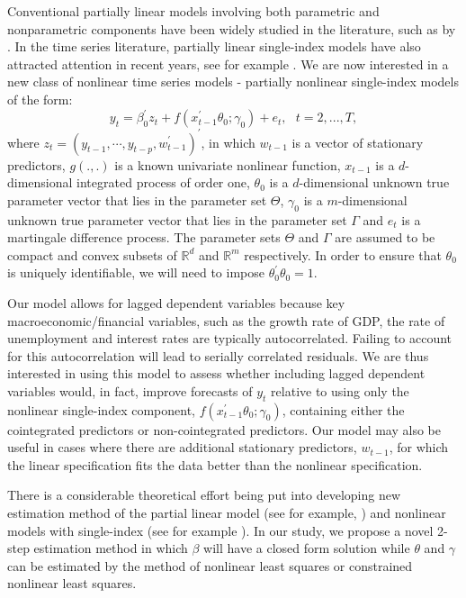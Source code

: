 \documentclass[a4paper,12pt,times,numbered,print,index]{report}
\numberwithin{equation}{section}
\begin{document}
Conventional partially linear models involving both parametric and nonparametric components have been widely studied in the literature, such as by \cite{gao2007nonlinear}. In the time series literature, partially linear single-index models have also attracted attention in recent years, see for example \cite{dong2016estimation}. We are now interested in a new class of nonlinear time series models - partially nonlinear single-index models of the form:
\begin{equation}
y_{t} = \beta_0^{\prime} z_t + f\left( x_{t-1}^{\prime }\theta_0; \gamma_0\right) +e_{t},\ \ \
t=2,...,T,  \label{PL model}
\end{equation}%
where $z_t = (y_{t-1}, \cdots, y_{t-p}, w_{t-1}^{\prime})^{\prime}$, in which $w_{t-1}$ is a vector of stationary predictors, 
$g\left( .,.\right) $ is a known univariate nonlinear function, $x_{t-1}$ is a $d$-dimensional integrated process of order one, $\theta _{0}$ is a $d$-dimensional unknown true parameter vector that lies in the parameter set $\Theta $, $\gamma _{0}$ is a $m$-dimensional unknown true parameter vector that lies in the parameter set $\Gamma $ and $e_{t}$ is a martingale
difference process. The parameter sets $\Theta $ and $\Gamma $ are assumed to be compact and convex subsets of $\mathbb{R}^{d}$ and $\mathbb{R}^{m}$ respectively. In order to ensure that $\theta_0$ is uniquely identifiable, we will need to impose $\theta_{0}^{\prime}\theta_{0} = 1$.

Our model allows for lagged dependent variables because key macroeconomic/financial variables, such as the growth rate of GDP, the rate of unemployment and interest rates are typically autocorrelated. Failing to account for this autocorrelation will lead to serially correlated residuals. We are thus interested in using this model to assess whether including lagged dependent variables would, in fact, improve forecasts of $y_{t}$ relative to using only the nonlinear single-index component, $f\left( x_{t-1}^{\prime }\theta_0; \gamma_0\right)$, containing either the cointegrated predictors or non-cointegrated predictors. Our model may also be useful in cases where there are additional stationary predictors, $w_{t-1}$, for which the linear specification fits the data better than the nonlinear specification.

There is a considerable theoretical effort being put into developing new estimation method of the partial linear model (see for example, \cite{dong2016estimation}) and nonlinear models with single-index (see for example \cite{chang2003index}). In our study, we propose a novel 2-step estimation method in which $\beta$ will have a closed form solution while $\theta$ and $\gamma$ can be estimated by the method of nonlinear least squares or constrained nonlinear least squares.
\end{document}
